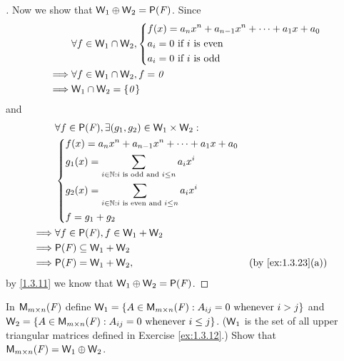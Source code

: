 \begin{proof}[]
	Now we show that \(\W_1 \oplus \W_2 = \ps{\F}\).
	Since
	\begin{align*}
		         & \forall f \in \mathsf{W}_1 \cap \mathsf{W}_2, \begin{dcases}
			                                         f(x) = a_n x^n + a_{n - 1} x^n + \cdots + a_1 x + a_0 \\
			                                         a_i = 0 \text{ if } i \text{ is even}                 \\
			                                         a_i = 0 \text{ if } i \text{ is odd}
		                                         \end{dcases} \\
		\implies & \forall f \in \mathsf{W}_1 \cap \mathsf{W}_2, f = \mathit{0}                                               \\
		\implies & \mathsf{W}_1 \cap \mathsf{W}_2 = \left\lbrace\mathit{0}\right\rbrace
	\end{align*}
	and
	\begin{align*}
		         & \forall f \in \ps{\F}, \exists (g_1, g_2) \in \W_1 \times \W_2 :                                 \\
		         & \begin{dcases}
			           f(x) = a_n x^n + a_{n - 1} x^n + \cdots + a_1 x + a_0              \\
			           g_1(x) = \sum_{i \in \N : i \text{ is odd and } i \leq n} a_i x^i  \\
			           g_2(x) = \sum_{i \in \N : i \text{ is even and } i \leq n} a_i x^i \\
			           f = g_1 + g_2
		           \end{dcases}                           \\
		\implies & \forall f \in \ps{\F}, f \in \W_1 + \W_2                                                         \\
		\implies & \ps{\F} \subseteq \W_1 + \W_2                                                                    \\
		\implies & \ps{\F} = \W_1 + \W_2,                                                    &  & \by{ex:1.3.23}[a]
	\end{align*}
	by \cref{1.3.11} we know that \(\W_1 \oplus \W_2 = \ps{\F}\).
\end{proof}

\begin{ex}\label{ex:1.3.26}
	In \(\ms\) define \(\W_1 = \set{A \in \ms : A_{i j} = 0 \text{ whenever } i > j}\) and \(\W_2 = \set{A \in \ms : A_{i j} = 0 \text{ whenever } i \leq j}\).
	(\(\mathsf{W}_1\) is the set of all upper triangular matrices defined in Exercise \cref{ex:1.3.12}.)
	Show that \(\ms = \W_1 \oplus \W_2\).
\end{ex}

